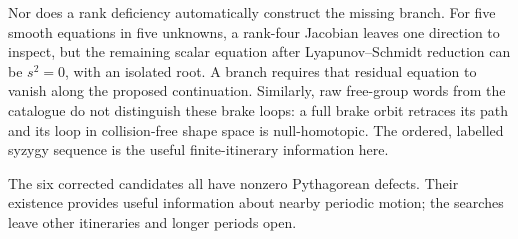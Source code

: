Nor does a rank deficiency automatically construct the missing branch.
For five smooth equations in five unknowns, a rank-four Jacobian leaves
one direction to inspect, but the remaining scalar equation after
Lyapunov--Schmidt reduction can be $s^2=0$, with an isolated root. A branch
requires that residual equation to vanish along the proposed continuation.
Similarly, raw free-group words from the catalogue do not distinguish
these brake loops: a full brake orbit retraces its path and its loop in
collision-free shape space is null-homotopic. The ordered, labelled
syzygy sequence is the useful finite-itinerary information here.

The six corrected candidates all have nonzero Pythagorean defects.
Their existence provides useful information about nearby periodic motion;
the searches leave other itineraries and longer periods open.
